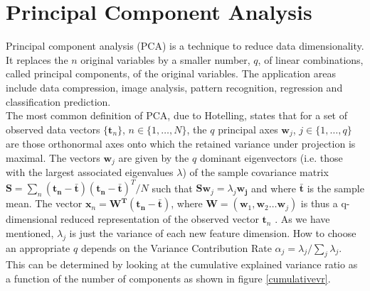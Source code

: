\documentclass{standalone}
\begin{document}
\section{Principal Component Analysis}
Principal component analysis (PCA) is a technique to reduce data dimensionality.
It replaces the $n$ original variables by a smaller number, $q$, of linear combinations, called principal components, of the original variables.
The application areas include data compression, image analysis, pattern recognition, regression and classification prediction\cite{PCA}.\\
The most common definition of PCA, due to Hotelling, states that for a set of observed data vectors 
$ \{ \mathbf{t}_{n} \}$, $n \in \{1, \dots, N \} $, the $q$ principal axes $\mathbf{w}_j$, $j \in \{ 1, \dots, q \} $ are those orthonormal axes onto which the retained variance under projection is maximal.
The vectors $\mathbf{w}_j$ are given by the $q$ dominant eigenvectors (i.e. those with the largest associated eigenvalues $\lambda$) of the sample covariance matrix $\mathbf{S} = \sum_{n}^{} ( \mathbf{t_n} - \mathbf{\bar{t}}) ( \mathbf{t_n} - \mathbf{\bar{t}})^T / N$ such that  $ \mathbf{S}\mathbf{w}_j = \lambda_j \mathbf{w_j}$ and where $\mathbf{\bar{t}}$ is the sample mean.
The vector $\mathbf{x}_{n} = \mathbf{W^T} (\mathbf{t_n} - \mathbf{\bar{t}})$, where $ \mathbf{W} = (\mathbf{w}_1 , \mathbf{w}_2 \dots \mathbf{w}_j)$ is thus a q-dimensional reduced representation of the observed vector $\mathbf{t}_{n}$ \cite{PCA}.
As we have mentioned, $\lambda_j$ is just the variance of each new feature dimension.
How to choose an appropriate $q$ depends on the Variance Contribution Rate  $\alpha_j = \lambda_j / \sum_{j}^{} \lambda_j $. 
This can be determined by looking at the cumulative explained variance ratio as a function of the number of components as shown in figure \ref{cumulativevr}.
\end{document}
